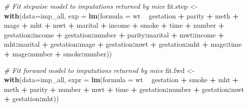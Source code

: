 \documentclass[]{article}
\newenvironment{Shaded}{\begin{snugshade}}{\end{snugshade}}
\newcommand{\KeywordTok}[1]{\textcolor[rgb]{0.13,0.29,0.53}{\textbf{#1}}}
\newcommand{\DataTypeTok}[1]{\textcolor[rgb]{0.13,0.29,0.53}{#1}}
\newcommand{\StringTok}[1]{\textcolor[rgb]{0.31,0.60,0.02}{#1}}
\newcommand{\CommentTok}[1]{\textcolor[rgb]{0.56,0.35,0.01}{\textit{#1}}}
\newcommand{\OperatorTok}[1]{\textcolor[rgb]{0.81,0.36,0.00}{\textbf{#1}}}
\newcommand{\NormalTok}[1]{#1}
\begin{document}
\begin{Shaded}
\begin{Highlighting}[]
\CommentTok{# Fit stepwise model to imputations returned by mice }
\NormalTok{fit.step <-}\StringTok{ }\KeywordTok{with}\NormalTok{(}\DataTypeTok{data=}\NormalTok{imp_all, }\DataTypeTok{exp =} \KeywordTok{lm}\NormalTok{(}\DataTypeTok{formula =}\NormalTok{ wt }\OperatorTok{~}\StringTok{ }\NormalTok{gestation }\OperatorTok{+}\StringTok{ }\NormalTok{parity }\OperatorTok{+}\StringTok{ }\NormalTok{meth }\OperatorTok{+}\StringTok{ }\NormalTok{mage }\OperatorTok{+}\StringTok{ }
\StringTok{    }\NormalTok{mht }\OperatorTok{+}\StringTok{ }\NormalTok{mwt }\OperatorTok{+}\StringTok{ }\NormalTok{marital }\OperatorTok{+}\StringTok{ }\NormalTok{income }\OperatorTok{+}\StringTok{ }\NormalTok{smoke }\OperatorTok{+}\StringTok{ }\NormalTok{time }\OperatorTok{+}\StringTok{ }\NormalTok{number }\OperatorTok{+}\StringTok{ }\NormalTok{gestation}\OperatorTok{:}\NormalTok{income }\OperatorTok{+}\StringTok{ }
\StringTok{    }\NormalTok{gestation}\OperatorTok{:}\NormalTok{number }\OperatorTok{+}\StringTok{ }\NormalTok{parity}\OperatorTok{:}\NormalTok{marital }\OperatorTok{+}\StringTok{ }\NormalTok{mwt}\OperatorTok{:}\NormalTok{income }\OperatorTok{+}\StringTok{ }\NormalTok{mht}\OperatorTok{:}\NormalTok{marital }\OperatorTok{+}\StringTok{ }
\StringTok{    }\NormalTok{gestation}\OperatorTok{:}\NormalTok{mage }\OperatorTok{+}\StringTok{ }\NormalTok{gestation}\OperatorTok{:}\NormalTok{mwt }\OperatorTok{+}\StringTok{ }\NormalTok{gestation}\OperatorTok{:}\NormalTok{mht }\OperatorTok{+}\StringTok{ }\NormalTok{mage}\OperatorTok{:}\NormalTok{time }\OperatorTok{+}\StringTok{ }
\StringTok{    }\NormalTok{mage}\OperatorTok{:}\NormalTok{number }\OperatorTok{+}\StringTok{ }\NormalTok{smoke}\OperatorTok{:}\NormalTok{number))}


\CommentTok{# Fit forward model to imputations returned by mice }
\NormalTok{fit.fwd <-}\StringTok{ }\KeywordTok{with}\NormalTok{(}\DataTypeTok{data=}\NormalTok{imp_all, }\DataTypeTok{expr =} \KeywordTok{lm}\NormalTok{(}\DataTypeTok{formula =}\NormalTok{ wt }\OperatorTok{~}\StringTok{ }\NormalTok{gestation }\OperatorTok{+}\StringTok{ }
\StringTok{    }\NormalTok{smoke }\OperatorTok{+}\StringTok{ }\NormalTok{mht }\OperatorTok{+}\StringTok{ }\NormalTok{meth }\OperatorTok{+}\StringTok{ }\NormalTok{parity }\OperatorTok{+}\StringTok{ }\NormalTok{number }\OperatorTok{+}\StringTok{ }\NormalTok{mwt }\OperatorTok{+}\StringTok{ }\NormalTok{time }\OperatorTok{+}\StringTok{ }\NormalTok{gestation}\OperatorTok{:}\NormalTok{number }\OperatorTok{+}\StringTok{ }
\StringTok{    }\NormalTok{gestation}\OperatorTok{:}\NormalTok{mwt }\OperatorTok{+}\StringTok{ }\NormalTok{gestation}\OperatorTok{:}\NormalTok{mht))}



\end{Highlighting}
\end{Shaded}
\end{document}
